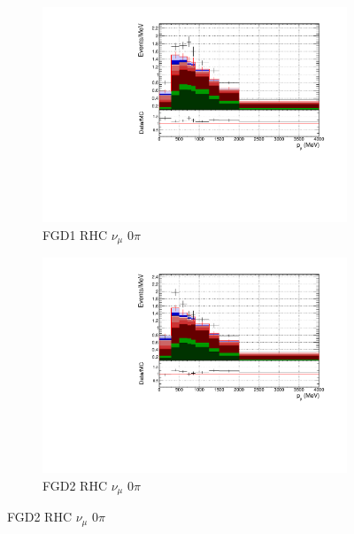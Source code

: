 \begin{figure}[!htbp]
\begin{subfigure}{0.49\textwidth}
  \centering
  \includegraphics[width=\textwidth]{figs/FGD1_NuMuBkg_CC0pi_in_AntiNu_Mode_p}
  \caption{FGD1 RHC $\nu_{\mu}$ 0$\pi$}
\end{subfigure}
\begin{subfigure}{0.49\textwidth}
  \centering
  \includegraphics[width=\textwidth]{figs/FGD2_NuMuBkg_CC0pi_in_AntiNu_Mode_p}
  \caption{FGD2 RHC $\nu_{\mu}$ 0$\pi$}
\end{subfigure}


\end{figure}
